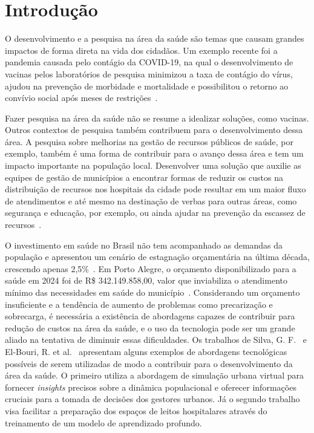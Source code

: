 \chapter{Introdução} \label{cpt:intro}
O desenvolvimento e a pesquisa na área da saúde são temas que causam grandes impactos de forma direta na vida dos cidadãos. 
Um exemplo recente foi a pandemia causada pelo contágio da COVID-19, na qual o desenvolvimento de vacinas pelos laboratórios de pesquisa minimizou a taxa de contágio do vírus, ajudou na prevenção de morbidade e mortalidade e possibilitou o retorno ao convívio social após meses de restrições~\cite{VACINAS}.

Fazer pesquisa na área da saúde não se resume a idealizar soluções, como vacinas. %
Outros contextos de pesquisa também contribuem para o desenvolvimento dessa área. A pesquisa sobre melhorias na gestão de recursos públicos de saúde, por exemplo, também é uma forma de contribuir para o avanço dessa área e tem um impacto importante na população local. Desenvolver uma solução que auxilie as equipes de gestão de municípios a encontrar formas de reduzir os custos na distribuição de recursos nos hospitais da cidade pode resultar em um maior fluxo de atendimentos e até mesmo na destinação de verbas para outras áreas, como segurança e educação, por exemplo, ou ainda ajudar na prevenção da escassez de recursos~\cite{ganesh2023fair}.

O investimento em saúde no Brasil não tem acompanhado as demandas da população e apresentou um cenário de estagnação orçamentária na última década, crescendo apenas 2,5\%~\cite{ORCAMENTOSAUDEBR}. Em Porto Alegre, o orçamento disponibilizado para a saúde em 2024 foi de R\$ 342.149.858,00, valor que inviabiliza o atendimento mínimo das necessidades em saúde do município~\cite{ORCAMENTO}. Considerando um orçamento insuficiente e a tendência de aumento de problemas como precarização e sobrecarga, é necessária a existência de abordagens capazes de contribuir para redução de custos na área da saúde, e o uso da tecnologia pode ser um grande aliado na tentativa de diminuir essas dificuldades. 
Os trabalhos de Silva, G. F.~\cite{9239083} e El-Bouri, R. et al.~\cite{9103941} apresentam alguns exemplos de abordagens tecnológicas possíveis de serem utilizadas de modo a contribuir para o desenvolvimento da área da saúde. O primeiro utiliza a abordagem de simulação urbana virtual para fornecer \textit{insights} precisos sobre a dinâmica populacional e oferecer informações cruciais para a tomada de decisões dos gestores urbanos. Já o segundo trabalho visa facilitar a preparação dos espaços de leitos hospitalares através do treinamento de um modelo de aprendizado profundo.

